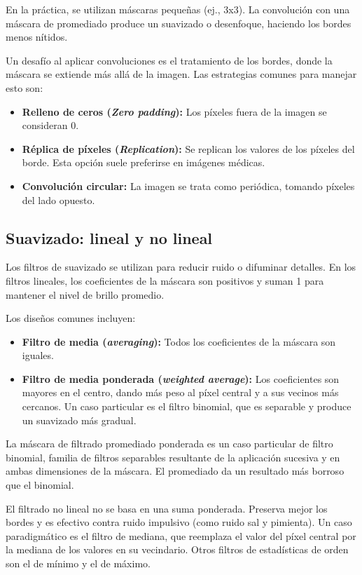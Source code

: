 En la práctica, se utilizan máscaras pequeñas (ej., 3x3). La convolución con una máscara de promediado produce un suavizado o desenfoque, haciendo los bordes menos nítidos.

Un desafío al aplicar convoluciones es el tratamiento de los bordes, donde la máscara se extiende más allá de la imagen. Las estrategias comunes para manejar esto son:
\begin{itemize}
\item \textbf{Relleno de ceros (\textit{Zero padding}):} Los píxeles fuera de la imagen se consideran 0.
\item \textbf{Réplica de píxeles (\textit{Replication}):} Se replican los valores de los píxeles del borde. Esta opción suele preferirse en imágenes médicas.
\item \textbf{Convolución circular:} La imagen se trata como periódica, tomando píxeles del lado opuesto.
\end{itemize}

\subsection{Suavizado: lineal y no lineal}
Los filtros de suavizado se utilizan para reducir ruido o difuminar detalles. En los filtros lineales, los coeficientes de la máscara son positivos y suman 1 para mantener el nivel de brillo promedio.

Los diseños comunes incluyen:
\begin{itemize}
\item \textbf{Filtro de media (\textit{averaging}):} Todos los coeficientes de la máscara son iguales.
\item \textbf{Filtro de media ponderada (\textit{weighted average}):} Los coeficientes son mayores en el centro, dando más peso al píxel central y a sus vecinos más cercanos. Un caso particular es el filtro binomial, que es separable y produce un suavizado más gradual.
\end{itemize}

La máscara de filtrado promediado ponderada es un caso particular de filtro binomial, familia de filtros separables resultante de la aplicación sucesiva y en ambas dimensiones de la máscara. El promediado da un resultado más borroso que el binomial.

El filtrado no lineal no se basa en una suma ponderada. Preserva mejor los bordes y es efectivo contra ruido impulsivo (como ruido sal y pimienta). Un caso paradigmático es el filtro de mediana, que reemplaza el valor del píxel central por la mediana de los valores en su vecindario. Otros filtros de estadísticas de orden son el de mínimo y el de máximo.


